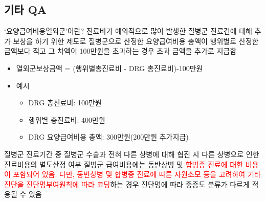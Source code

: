 \subsection{기타 QA}
\begin{commentbox}{‘요양급여비용열외군’이란?}
진료비가 예외적으로 많이 발생한 질병군 진료건에 대해 추가 보상을 하기 위한 제도로 질병군으로 산정한 요양급여비용 총액이 행위별로 산정한 금액보다 적고 그 차액이 100만원을 초과하는 경우 초과 금액을 추가로 지급함
\begin{itemize}\tightlist
\item 열외군보상금액 = (행위별총진료비 - DRG 총진료비)-100만원
\item 예시
	\begin{itemize}\tightlist
	\item  DRG 총진료비: 100만원
	\item 행위별 총진료비: 400만원
	\item DRG 요양급여비용 총액: 300만원(200만원 추가지급) 
	\end{itemize}
\end{itemize}	
\end{commentbox}
\prezi{\clearpage}
\prezi{\clearpage}
\begin{commentbox}{질병군 진료기간 중 질병군 수술과 전혀 다른 상병에 대해 협진 시 다른 상병으로 인한 진료비용의 별도산정 여부}
질병군 급여비용에는 동반상병 및 \textcolor{red}{합병증 진료에 대한 비용이 포함되어 있음. 
다만, 동반상병 및 합병증 진료에 따른 자원소모 등을 고려하여 기타진단을 진단명부여원칙에 따라 코딩}하는 경우 진단명에 따라 중증도 분류가 다르게 적용될 수 있음
\end{commentbox}
